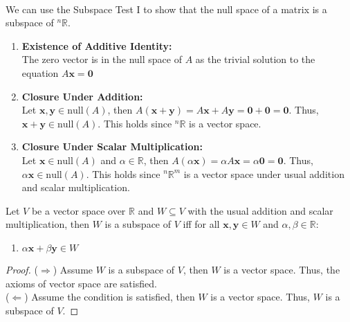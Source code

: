 \documentclass[11pt]{article}
\begin{document}
    \paragraph{} We can use the Subspace Test I to show that the null space of a matrix is a subspace of $^n\mathbb{R}$.
        \begin{enumerate}
            \item \textbf{Existence of Additive Identity:} \\
            The zero vector is in the null space of $A$ as the trivial solution to the equation $A\textbf{x} = \textbf{0}$
            \item \textbf{Closure Under Addition:} \\
            Let $\textbf{x}, \textbf{y} \in \text{null}(A)$, then $A(\textbf{x} + \textbf{y}) = A\textbf{x} + A\textbf{y} = \textbf{0} + \textbf{0} = \textbf{0}$. Thus, $\textbf{x} + \textbf{y} \in \text{null}(A)$. This holds since $^n\mathbb{R}$ is a vector space.
            \item \textbf{Closure Under Scalar Multiplication:} \\
            Let $\textbf{x} \in \text{null}(A)$ and $\alpha \in \mathbb{R}$, then $A(\alpha \textbf{x}) = \alpha A\textbf{x} = \alpha \textbf{0} = \textbf{0}$. Thus, $\alpha \textbf{x} \in \text{null}(A)$. This holds since $^n\mathbb{R}^m$ is a vector space under usual addition and scalar multiplication.
        \end{enumerate}
\begin{theorem}
    Let $V$ be a vector space over $\mathbb{R}$ and $W \subseteq V$ with the usual addition and scalar multiplication, then $W$ is a subspace of $V$ iff for all $\textbf{x}, \textbf{y} \in W$ and $\alpha, \beta \in \mathbb{R}$:
    \begin{enumerate}
        \item $\alpha \textbf{x} + \beta \textbf{y} \in W$
    \end{enumerate}
\end{theorem}
\begin{proof}
    ($\Rightarrow$) Assume $W$ is a subspace of $V$, then $W$ is a vector space. Thus, the axioms of vector space are satisfied. \\
    ($\Leftarrow$) Assume the condition is satisfied, then $W$ is a vector space. Thus, $W$ is a subspace of $V$.
\end{proof}
\end{document}
